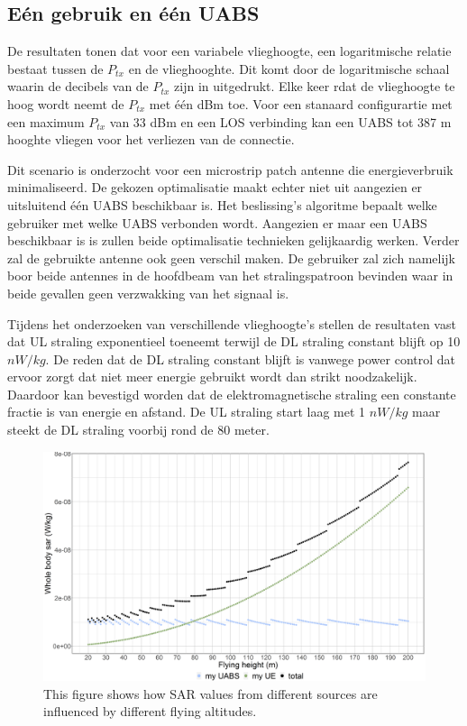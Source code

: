 \documentclass[twocolumn]{phdsymp_dutch}
\begin{document}
\subsection{E\'en gebruik en \'e\'en \gls{UABS}}
De resultaten tonen dat voor een variabele vlieghoogte, een logaritmische relatie bestaat tussen de 
 $P_{tx}$ en de vlieghooghte.
 Dit komt door de logaritmische schaal waarin de decibels van de $P_{tx}$ zijn in uitgedrukt.
Elke keer rdat de vlieghoogte te hoog wordt neemt de $P_{tx}$ met \'e\'en dBm toe.
Voor een stanaard configurartie met een maximum $P_{tx}$ van 33 dBm en een \gls{LOS} verbinding kan een 
\gls{UABS} tot 387 m hooghte vliegen voor het verliezen van de connectie.

Dit scenario is onderzocht voor een microstrip patch antenne die energieverbruik minimaliseerd.
De gekozen optimalisatie maakt echter niet uit aangezien er uitsluitend \'e\'en \gls{UABS} beschikbaar is.
Het beslissing's algoritme bepaalt welke gebruiker met welke \gls{UABS} verbonden wordt.
Aangezien er maar een \gls{UABS} beschikbaar is is zullen beide optimalisatie technieken gelijkaardig werken.
Verder zal de gebruikte antenne ook geen verschil maken. 
De gebruiker zal zich namelijk boor beide antennes in de hoofdbeam van het stralingspatroon 
bevinden waar in beide gevallen geen verzwakking van het signaal is.

Tijdens het onderzoeken van verschillende vlieghoogte's stellen de resultaten vast  dat
\gls{UL} straling exponentieel toeneemt terwijl de \gls{DL} straling constant blijft op 
10 $nW/kg$. De reden dat de \gls{DL} straling constant blijft is vanwege power control dat ervoor zorgt
dat niet meer energie gebruikt wordt dan strikt noodzakelijk. 
Daardoor kan bevestigd worden dat de elektromagnetische straling een constante fractie is van energie en afstand.
De \gls{UL} straling start laag met 1 $nW/kg$ maar steekt de \gls{DL} straling voorbij rond de 80 meter.

\begin{figure}[]
\centering
  \includegraphics[width=\linewidth]{s1/fhvssar.png}
  \caption{This figure shows how SAR values from different sources are influenced by different flying altitudes.}
  \label{fig:s1_fhsar}
\end{figure}
\end{document}
